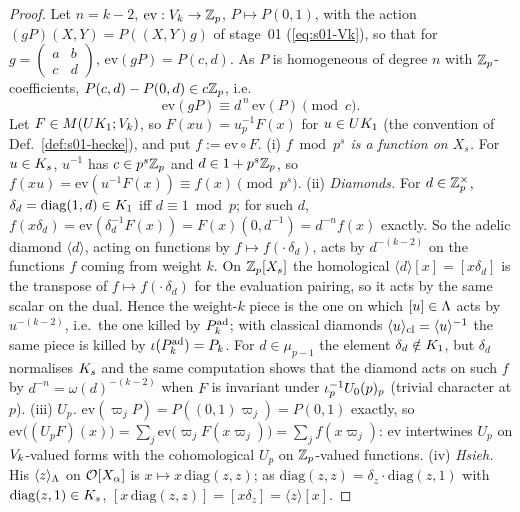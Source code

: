 \begin{proof}
Let $n=k-2$, $\mathrm{ev}:V_k\to\mathbb{Z}_p$, $P\mapsto P(0,1)$, with the action $(gP)(X,Y)=P((X,Y)g)$ of stage~01 (\eqref{eq:s01-Vk}), so that for
$g=\left(\begin{smallmatrix}a&b\\c&d\end{smallmatrix}\right)$, $\mathrm{ev}(gP)=P(c,d)$. As $P$ is homogeneous of degree $n$ with
$\mathbb{Z}_p$-coefficients, $P(c,d)-P(0,d)\in c\mathbb{Z}_p$, i.e.
\[\mathrm{ev}(gP)\equiv d^{\,n}\,\mathrm{ev}(P)\pmod{c}.\]
Let $F\in M(UK_{1};V_k)$, so $F(xu)=u_p^{-1}F(x)$ for $u\in UK_{1}$ (the convention of Def.~\ref{def:s01-hecke}), and
put $f:=\mathrm{ev}\circ F$.
(i) \emph{$f\bmod p^s$ is a function on $X_s$.} For $u\in K_{s}$, $u^{-1}$ has $c\in p^s\mathbb{Z}_p$ and $d\in1+p^s\mathbb{Z}_p$, so
$f(xu)=\mathrm{ev}(u^{-1}F(x))\equiv f(x)\pmod{p^s}$.
(ii) \emph{Diamonds.} For $d\in\mathbb{Z}_p^\times$, $\delta_d=\mathrm{diag}(1,d)\in K_{1}$ iff $d\equiv1\bmod p$; for such $d$,
$f(x\delta_d)=\mathrm{ev}(\delta_d^{-1}F(x))=F(x)(0,d^{-1})=d^{-n}f(x)$ exactly. So the adelic diamond $\langle d\rangle$, acting on
functions by $f\mapsto f(\cdot\,\delta_d)$, acts by $d^{-(k-2)}$ on the functions $f$ coming from weight $k$. On $\mathbb{Z}_p[X_s]$ the
homological $\langle d\rangle[x]=[x\delta_d]$ is the transpose of $f\mapsto f(\cdot\,\delta_d)$ for the evaluation pairing, so it acts
by the same scalar on the dual. Hence the weight-$k$ piece is the one on which $[u]\in\Lambda$ acts by $u^{-(k-2)}$, i.e.\ the one killed by
$P^{\rm ad}_k$; with classical diamonds $\langle u\rangle_{\rm cl}=\langle u\rangle^{-1}$ the same piece is killed by $\iota(P^{\rm ad}_k)=P_k$.
For $d\in\mu_{p-1}$ the element $\delta_d\notin K_{1}$, but $\delta_d$ normalises $K_{s}$ and the same computation shows that the
diamond acts on such $f$ by $d^{-n}=\omega(d)^{-(k-2)}$ when $F$ is invariant under $\iota_p^{-1}U_0(p)_p$ (trivial character at $p$).
(iii) \emph{$U_p$.} $\mathrm{ev}(\varpi_jP)=P((0,1)\varpi_j)=P(0,1)$ exactly, so
$\mathrm{ev}\big((U_pF)(x)\big)=\sum_j\mathrm{ev}\big(\varpi_jF(x\varpi_j)\big)=\sum_jf(x\varpi_j)$: $\mathrm{ev}$ intertwines $U_p$ on
$V_k$-valued forms with the cohomological $U_p$ on $\mathbb{Z}_p$-valued functions.
(iv) \emph{Hsieh.} His $\langle z\rangle_\Lambda$ on $\mathcal{O}[X_\alpha]$ is $x\mapsto x\,\mathrm{diag}(z,z)$; as
$\mathrm{diag}(z,z)=\delta_z\cdot\mathrm{diag}(z,1)$ with $\mathrm{diag}(z,1)\in K_{s}$, $[x\,\mathrm{diag}(z,z)]=[x\delta_z]=\langle z\rangle[x]$.
\end{proof}

